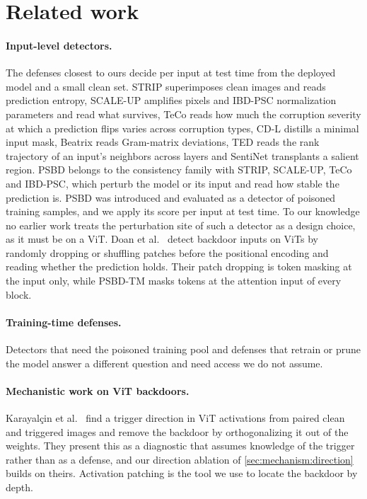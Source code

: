 \section{Related work}
\label{sec:related}

\paragraph{Input-level detectors.}
The defenses closest to ours decide per input at test time from the deployed model and a small clean set. STRIP \cite{gao2019strip} superimposes clean images and reads prediction entropy, SCALE-UP \cite{guo2023scale} amplifies pixels and IBD-PSC \cite{hou2024ibdpsc} normalization parameters and read what survives, TeCo \cite{liu2023teco} reads how much the corruption severity at which a prediction flips varies across corruption types, CD-L \cite{huang2023distilling} distills a minimal input mask, Beatrix \cite{ma2023beatrix} reads Gram-matrix deviations, TED \cite{mo2024ted} reads the rank trajectory of an input's neighbors across layers and SentiNet \cite{chou2020sentinet} transplants a salient region. PSBD \cite{li2025psbd} belongs to the consistency family with STRIP, SCALE-UP, TeCo and IBD-PSC, which perturb the model or its input and read how stable the prediction is. PSBD was introduced and evaluated as a detector of poisoned training samples, and we apply its score per input at test time. To our knowledge no earlier work treats the perturbation site of such a detector as a design choice, as it must be on a ViT. Doan et al.~\cite{doan2023vitpatch} detect backdoor inputs on ViTs by randomly dropping or shuffling patches before the positional encoding and reading whether the prediction holds. Their patch dropping is token masking at the input only, while PSBD-TM masks tokens at the attention input of every block.

\paragraph{Training-time defenses.}
Detectors that need the poisoned training pool \cite{tran2018spectral,chen2018activation,tang2021demon,hayase2021spectre} and defenses that retrain or prune the model \cite{liu2018finepruning,li2021nad,wu2021anp,zeng2022ibau,zheng2022clp} answer a different question and need access we do not assume.

\paragraph{Mechanistic work on ViT backdoors.}
Karayal\c{c}in et al.~\cite{karayalcin2026backdoor} find a trigger direction in ViT activations from paired clean and triggered images and remove the backdoor by orthogonalizing it out of the weights. They present this as a diagnostic that assumes knowledge of the trigger rather than as a defense, and our direction ablation of \cref{sec:mechanism:direction} builds on theirs. Activation patching \cite{zhang2024patching} is the tool we use to locate the backdoor by depth.
